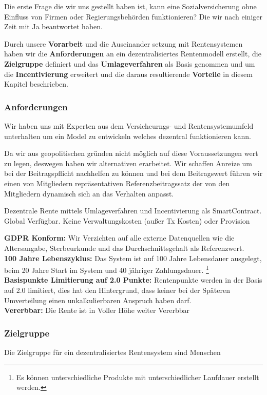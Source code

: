 Die erste Frage die wir uns gestellt haben ist, kann eine Sozialversicherung ohne Einfluss von Firmen oder Regierungsbehörden funktionieren? Die wir nach einiger Zeit mit Ja beantwortet haben.

Durch unsere \textbf{Vorarbeit} und die Auseinander setzung mit Rentensystemen haben wir die \textbf{Anforderungen} an ein dezentralisiertes Rentenmodell erstellt, die  \textbf{Zielgruppe} definiert und das \textbf{Umlageverfahren} als Basis genommen und um die \textbf{Incentivierung} erweitert und die daraus resultierende \textbf{Vorteile} in diesem Kapitel beschrieben.

\subsubsection*{Anforderungen}
Wir haben uns mit Experten aus dem Versicheurngs- und Rentensystemumfeld unterhalten um ein Model zu entwickeln welches dezentral funktionieren kann.

Da wir aus geopolitischen gründen nicht möglich auf diese Voraussetzungen wert zu legen, deswegen haben wir alternativen erarbeitet.
Wir schaffen Anreize um bei der Beitragspflicht nachhelfen zu können und bei dem Beitragswert führen wir einen von Mitgliedern repräsentativen Referenzbeitragssatz der von den Mitgliedern dynamisch sich an das Verhalten anpasst.

Dezentrale Rente mittels Umlageverfahren und Incentivierung als SmartContract.
Global Verfügbar. Keine Verwaltungskosten (außer Tx Kosten) oder Provision

\textbf{GDPR\cite{gdpr} Konform:} Wir Verzichten auf alle externe Datenquellen wie die Altersangabe, Sterbeurkunde und das Durchschnittsgehalt als Referenzwert.\\
\textbf{100 Jahre Lebenszyklus:} Das System ist auf 100 Jahre Lebensdauer ausgelegt, beim 20 Jahre Start im System und 40 jähriger Zahlungsdauer. \footnote{ Es können unterschiedliche Produkte mit unterschiedlicher Laufdauer erstellt werden.} \\
\textbf{Basispunkte Limitierung auf 2.0 Punkte:} Rentenpunkte werden in der Basis auf 2.0 limitiert, dies hat den Hintergrund, dass keiner bei der Späteren Umverteilung einen unkalkulierbaren Anspruch haben darf.\\
\textbf{Vererbbar:} Die Rente ist in Voller Höhe weiter Vererbbar


\subsubsection*{Zielgruppe}
Die Zielgruppe für ein dezentralisiertes Rentensystem sind Menschen

